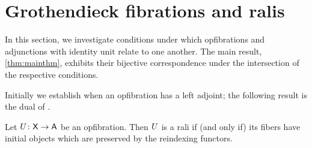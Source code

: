 \documentclass{amsart}
\begin{document}
\section{Grothendieck fibrations and ralis}
\label{sec:groth-fibs-ralis}

In this section, we investigate conditions under which opfibrations and adjunctions with identity unit relate to one another. The main result, \cref{thm:mainthm}, exhibits their bijective correspondence under the intersection of the respective conditions.

Initially we establish when an opfibration has a left adjoint; the following result is the dual of \cite[Prop. 4.4]{Grayfibredandcofibred}.

\begin{prop} \label{prop:opfibtolari}
  Let $U \colon \mathsf{X} \to \mathsf{A}$ be an opfibration. Then
  $U$ is a rali if (and only if) its fibers have
  initial objects which are preserved by the
  reindexing functors.
\end{prop}
\end{document}
